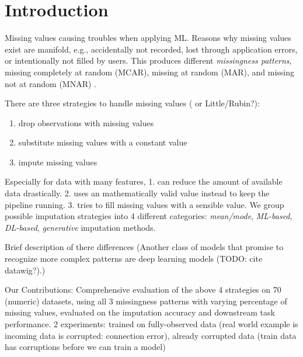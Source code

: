 \section{Introduction}


Missing values causing troubles when applying ML. Reasons why missing values exist are manifold, e.g., accidentally not recorded, lost through application errors, or intentionally not filled by users. This produces different \emph{missingness patterns}, missing completely at random (MCAR), missing at random (MAR), and missing not at random (MNAR) \cite{Buuren}.

There are three strategies to handle missing values (\cite{Buuren} or Little/Rubin?):
\begin{enumerate}
	\item drop observations with missing values
	\item substitute missing values with a constant value
	\item impute missing values
\end{enumerate}

Especially for data with many features, 1. can reduce the amount of available data drastically. 2. uses an mathematically valid value instead to keep the pipeline running. 3. tries to fill missing values with a sensible value. We group possible imputation strategies into 4 different categories: \emph{mean/mode}, \emph{ML-based}, \emph{DL-based}, \emph{generative} imputation methods.

Brief description of there differences
(Another class of models that promise to recognize more complex patterns are deep learning models (TODO: cite datawig?).)

Our Contributions: Comprehensive evaluation of the above 4 strategies on 70 (numeric) datasets, using all 3 missingness patterns with varying percentage of missing values, evaluated on the imputation accuracy and downstream task performance. 2 experiments: trained on fully-observed data (real world example is incoming data is corrupted: connection error), already corrupted data (train data has corruptions before we can train a model)
